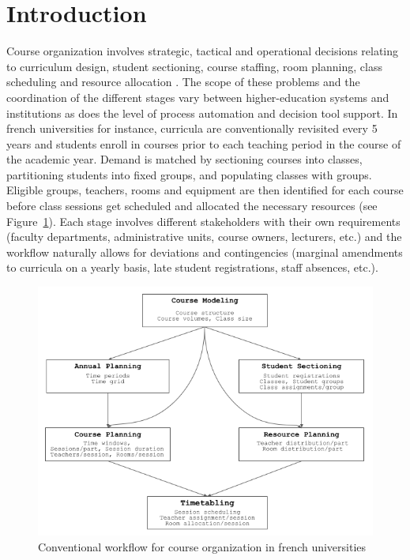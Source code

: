 \section{Introduction}
\label{sec:introduction}

Course organization %
involves strategic, tactical and operational decisions relating to curriculum design, student sectioning, course staffing, room planning, 
class scheduling and resource allocation \cite{overview_uctp_2016_malaysian}.
The scope %
of these problems and the coordination of the different stages
vary between higher-education systems and institutions 
as does the level of process automation and decision tool support.
In french universities for instance, curricula are conventionally revisited every 5 years and 
students enroll in courses prior to each teaching period in the course of the academic year. %
Demand is matched by sectioning courses into classes, partitioning students %
into fixed groups, and populating classes with groups. %
Eligible groups, %
teachers, rooms and equipment are then identified for each course before class sessions get scheduled and allocated the necessary resources (see Figure~\ref{fig:utp-workflow}). 
Each stage involves 
different stakeholders with their own requirements
(faculty departments, administrative units, course owners, lecturers, etc.) 
and the workflow naturally allows for deviations and contingencies (marginal amendments to curricula on a yearly basis, late student registrations, staff absences, etc.).

\begin{figure}[h]
\begin{center}
\includegraphics[width=\columnwidth]{img/utp_workflow.png}
\end{center}
\caption{Conventional workflow for course organization in french universities}%

\label{fig:utp-workflow}
\end{figure}

